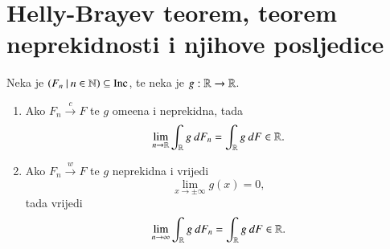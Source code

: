 
\chapter{Helly-Brayev teorem, teorem neprekidnosti i njihove posljedice}

\begin{tm}
    Neka je $({F_n} \: | \: {n \in \mathbb{N}}) \subseteq \mathrm{Inc}$, te neka je $g: \mathbb{R} \to \mathbb{R}$.
    \begin{enumerate}[label=(\roman*)]
        \item Ako $F_n \xrightarrow{c} F$ te $g$ ome\dj ena i neprekidna, tada
        \begin{equation*}
            \lim\limits_{n \to \mathbb{R}} \int_{\mathbb{R}} g \: d F_n = \int_{\mathbb{R}} g \: d F \in \mathbb{R}.
        \end{equation*}
        \item Ako $F_n \xrightarrow{w} F$ te $g$ neprekidna i vrijedi
        \begin{equation*}
            \lim\limits_{x \to \pm \infty} g (x) = 0,    
        \end{equation*}
        tada vrijedi
        \begin{equation*}
            \lim\limits_{n \to \infty} \int_{\mathbb{R}} g \: d F_n = \int_{\mathbb{R}} g \: d F \in \mathbb{R}.
        \end{equation*}
    \end{enumerate}
\end{tm}